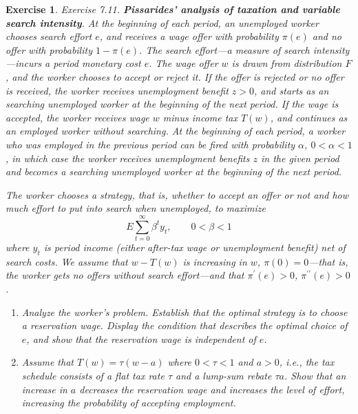 \documentclass[11pt]{article}
\newtheorem{exercise}[theorem]{Exercise}
\newenvironment{draftnote}[1][Draft note]{}{}
\begin{document}
\begin{draftnote}
\pprintfilename
\end{draftnote}

\begin{exercise}
\cite{ljungqvist_sargent:2020} Exercise 7.11. \textbf{Pissarides' analysis
of taxation and variable search intensity}. At the beginning of each period,
an unemployed worker chooses search effort $e$, and receives a wage offer
with probability $\pi \left( e\right) $ and no offer with probability $1-\pi
\left( e\right) $. The search effort---a measure of search
intensity---incurs a period monetary cost $e$. The wage offer $w$ is drawn
from distribution $F$, and the worker chooses to accept or reject it. If the
offer is rejected or no offer is received, the worker receives unemployment
benefit $z>0$, and starts as an searching unemployed worker at the beginning
of the next period. If the wage is accepted, the worker receives wage $w$
minus income tax $T\left( w\right) $, and continues as an employed worker
without searching. At the beginning of each period, a worker who was
employed in the previous period can be fired with probability $\alpha $, $%
0<\alpha <1$, in which case the worker receives unemployment benefits $z$ in
the given period and becomes a searching unemployed worker at the beginning
of the next period.

The worker chooses a strategy, that is, whether to accept an offer or not
and how much effort to put into search when unemployed, to maximize%
\begin{equation*}
E\sum_{t=0}^{\infty }\beta ^{t}y_{t},\qquad 0<\beta <1
\end{equation*}%
where $y_{t}$ is period income (either after-tax wage or unemployment
benefit) net of search costs. We assume that $w-T\left( w\right) $ is
increasing in $w$, $\pi \left( 0\right) =0$---that is, the worker gets no
offers without search effort---and that $\pi ^{\prime }\left( e\right) >0$, $%
\pi ^{\prime \prime }\left( e\right) >0$.

\begin{enumerate}
\item[a)] Analyze the worker's problem. Establish that the optimal strategy
is to choose a reservation wage. Display the condition that describes the
optimal choice of $e$, and show that the reservation wage is independent of $%
e$.

\item[b)] Assume that $T\left( w\right) =\tau \left( w-a\right) $ where $%
0<\tau <1$ and $a>0$, i.e., the tax schedule consists of a flat tax rate $%
\tau $ and a lump-sum rebate $\tau a$. Show that an increase in $a$
decreases the reservation wage and increases the level of effort, increasing
the probability of accepting employment.


\end{enumerate}
\end{exercise}
\end{document}
